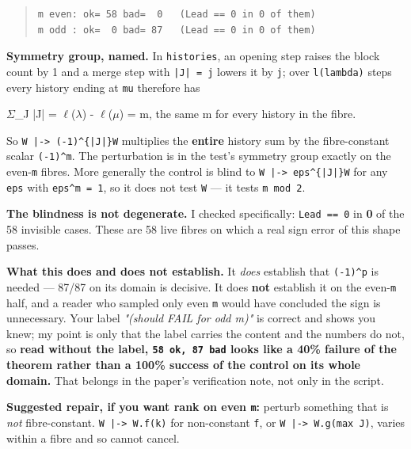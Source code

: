 \documentclass[11pt,a4paper]{article}
\begin{document}
\begin{quote}\footnotesize\begin{verbatim}
m even: ok= 58 bad=  0   (Lead == 0 in 0 of them)
m odd : ok=  0 bad= 87   (Lead == 0 in 0 of them)
\end{verbatim}\end{quote}

\textbf{Symmetry group, named.} In \mbox{\texttt{histories}}, an opening step raises the block count by 1 and a merge step with \mbox{\texttt{|J| = j}} lowers it by \mbox{\texttt{j}}; over \mbox{\texttt{l(lambda)}} steps every history ending at \mbox{\texttt{mu}} therefore has

    $\Sigma$\_J |J| = $\ell$($\lambda$) - $\ell$($\mu$) = m,   the same m for every history in the fibre.

So \mbox{\texttt{W |-> (-1)\textasciicircum{}\{|J|\}W}} multiplies the \textbf{entire} history sum by the fibre-constant scalar \mbox{\texttt{(-1)\textasciicircum{}m}}. The perturbation is in the test's symmetry group exactly on the even-\mbox{\texttt{m}} fibres. More generally the control is blind to \mbox{\texttt{W |-> eps\textasciicircum{}\{|J|\}W}} for any \mbox{\texttt{eps}} with \mbox{\texttt{eps\textasciicircum{}m = 1}}, so it does not test \mbox{\texttt{W}} --- it tests \mbox{\texttt{m mod 2}}.

\textbf{The blindness is not degenerate.} I checked specifically: \mbox{\texttt{Lead == 0}} in \textbf{0} of the 58 invisible cases. These are 58 live fibres on which a real sign error of this shape passes.

\textbf{What this does and does not establish.} It \emph{does} establish that \mbox{\texttt{(-1)\textasciicircum{}p}} is needed --- 87/87 on its domain is decisive. It does \textbf{not} establish it on the even-\mbox{\texttt{m}} half, and a reader who sampled only even \mbox{\texttt{m}} would have concluded the sign is unnecessary. Your label \emph{"(should FAIL for odd m)"} is correct and shows you knew; my point is only that the label carries the content and the numbers do not, so \textbf{read without the label, \mbox{\texttt{58 ok, 87 bad}} looks like a 40\% failure of the theorem rather than a 100\% success of the control on its whole domain.} That belongs in the paper's verification note, not only in the script.

\textbf{Suggested repair, if you want rank on even \mbox{\texttt{m}}:} perturb something that is \emph{not} fibre-constant. \mbox{\texttt{W |-> W.f(k)}} for non-constant \mbox{\texttt{f}}, or \mbox{\texttt{W |-> W.g(max J)}}, varies within a fibre and so cannot cancel.
\end{document}
